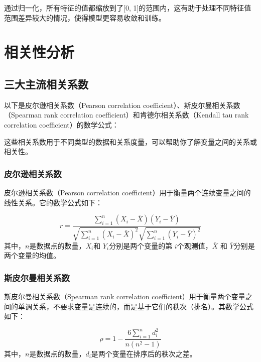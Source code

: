 \documentclass[UTF8,12pt]{ctexart}
\begin{document}
	通过归一化，所有特征的值都缩放到了[0, 1]的范围内，这有助于处理不同特征值范围差异较大的情况，使得模型更容易收敛和训练。


	
	
	
	\section{相关性分析}
	
	\subsection{三大主流相关系数}
	
	以下是皮尔逊相关系数（Pearson correlation coefficient）、斯皮尔曼相关系数（Spearman rank correlation coefficient）和肯德尔相关系数（Kendall tau rank correlation coefficient）的数学公式：
	


	
	这些相关系数用于不同类型的数据和关系度量，可以帮助你了解变量之间的关系或相关性。
	
	\subsubsection{皮尔逊相关系数}
	
	皮尔逊相关系数（Pearson correlation coefficient）用于衡量两个连续变量之间的线性关系。它的数学公式如下：
	
	\begin{equation}
		r = \frac{\sum_{i=1}^{n}(X_i - \bar{X})(Y_i - \bar{Y})}{\sqrt{\sum_{i=1}^{n}(X_i - \bar{X})^2}\sqrt{\sum_{i=1}^{n}(Y_i - \bar{Y})^2}} 
	\end{equation}
	其中，$n$是数据点的数量，$ X_i$和 $ Y_i$分别是两个变量的第 $ i $个观测值，$\bar{X} $ 和 $ \bar{Y} $分别是两个变量的均值。
	
	\subsubsection{斯皮尔曼相关系数}
	
		斯皮尔曼相关系数（Spearman rank correlation coefficient）用于衡量两个变量之间的单调关系，不要求变量是连续的，而是基于它们的秩次（排名）。其数学公式如下：
	
	\begin{equation}
		\rho = 1 - \frac{6\sum_{i=1}^{n}d_i^2}{n(n^2 - 1)}
	\end{equation}
	其中，$n$是数据点的数量，$d_i$是两个变量在排序后的秩次之差。
	
\end{document}
